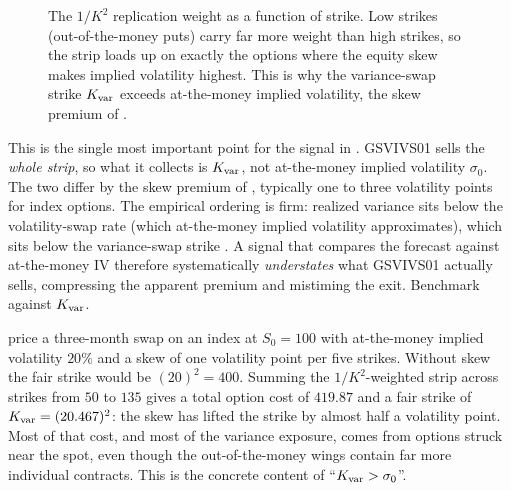 \begin{figure}[ht]
\centering
{}
\caption{The $1/K^2$ replication weight as a function of strike. Low strikes (out-of-the-money puts) carry far more weight than high strikes, so the strip loads up on exactly the options where the equity skew makes implied volatility highest. This is why the variance-swap strike $K_{\mathrm{var}}$ exceeds at-the-money implied volatility, the skew premium of .}
\label{fig:gsvivs:weight}
\end{figure}

\begin{warning}
This is the single most important point for the signal in . GSVIVS01 sells the \emph{whole strip}, so what it collects is $K_{\mathrm{var}}$, not at-the-money implied volatility $\sigma_0$. The two differ by the skew premium of , typically one to three volatility points for index options. The empirical ordering is firm: realized variance sits below the volatility-swap rate (which at-the-money implied volatility approximates), which sits below the variance-swap strike \citep{CarrWu2009}. A signal that compares the forecast against at-the-money IV therefore systematically \emph{understates} what GSVIVS01 actually sells, compressing the apparent premium and mistiming the exit. Benchmark against $K_{\mathrm{var}}$.
\end{warning}

\begin{workedexample}
\citet[Table~1, p.~21]{Demeterfi1999} price a three-month swap on an index at $S_0 = 100$ with at-the-money implied volatility $20\%$ and a skew of one volatility point per five strikes. Without skew the fair strike would be $(20)^2 = 400$. Summing the $1/K^2$-weighted strip across strikes from $50$ to $135$ gives a total option cost of $419.87$ and a fair strike of $K_{\mathrm{var}} = (20.467)^2$: the skew has lifted the strike by almost half a volatility point. Most of that cost, and most of the variance exposure, comes from options struck near the spot, even though the out-of-the-money wings contain far more individual contracts. This is the concrete content of ``$K_{\mathrm{var}} > \sigma_0$''.
\end{workedexample}

